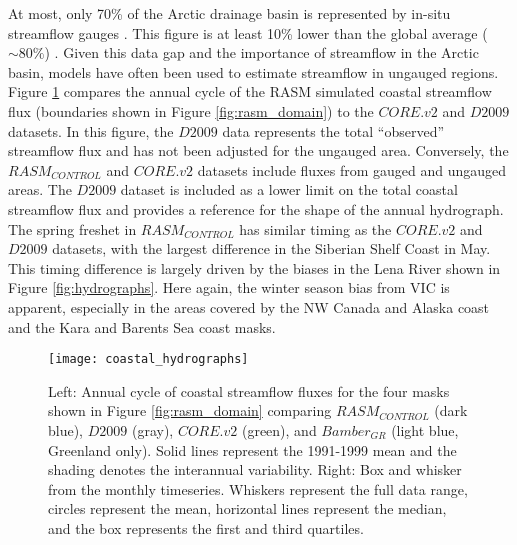 At most, only 70\% of the Arctic drainage basin is represented by in-situ streamflow gauges \citep{Shiklomanov_2000}.
This figure is at least 10\% lower than the global average ($\sim 80\%$) \citep{Dai_2009}.
Given this data gap and the importance of streamflow in the Arctic basin, models have often been used to estimate streamflow in ungauged regions.
Figure \ref{fig:coastal_hydrographs} compares the annual cycle of the RASM simulated coastal streamflow flux (boundaries shown in Figure \ref{fig:rasm_domain}) to the $CORE.v2$ and $D2009$ datasets.
In this figure, the $D2009$ data represents the total ``observed'' streamflow flux and has not been adjusted for the ungauged area.
Conversely, the $RASM_{CONTROL}$ and $CORE.v2$ datasets include fluxes from gauged and ungauged areas.
The $D2009$ dataset is included as a lower limit on the total coastal streamflow flux and provides a reference for the shape of the annual hydrograph.
The spring freshet in $RASM_{CONTROL}$ has similar timing as the $CORE.v2$ and $D2009$ datasets, with the largest difference in the Siberian Shelf Coast in May.
This timing difference is largely driven by the biases in the Lena River shown in Figure \ref{fig:hydrographs}.
Here again, the winter season bias from VIC is apparent, especially in the areas covered by the NW Canada and Alaska coast and the Kara and Barents Sea coast masks.

\begin{figure}
    \centering
    \texttt{[image: coastal\_hydrographs]}
    \caption{Left: Annual cycle of coastal streamflow fluxes for the four masks shown in Figure \ref{fig:rasm_domain} comparing $RASM_{CONTROL}$ (dark blue), $D2009$ (gray), $CORE.v2$ (green), and $Bamber_{GR}$ (light blue, Greenland only).
    Solid lines represent the 1991-1999 mean and the shading denotes the interannual variability.
    Right: Box and whisker from the monthly timeseries.
    Whiskers represent the full data range, circles represent the mean, horizontal lines represent the median, and the box represents the first and third quartiles.
    }
    \label{fig:coastal_hydrographs}
\end{figure}

